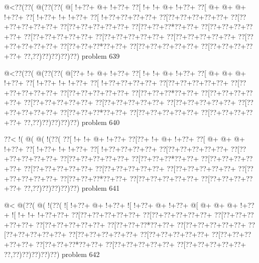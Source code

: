 \vbox{\vbox{\goo
\- @<\0??(\0??(\- @(\0??(\0??(
\- @[\- !+\0??+\- @+\- !+\0??+
\0??[\- !+\- !+\- @+\- !+\0??+
\0??[\- @+\- @+\- @+\- !+\0??+
\0??[\- !+\0??+\- !+\- !+\0??+
\0??[\- !+\0??+\0??+\0??+\0??+
\0??[\0??+\0??+\0??+\0??+\0??+
\0??[\0??+\0??+\0??+\0??+\0??+
\0??[\0??+\0??+\0??+\0??+\0??+
\0??[\0??+\0??+\0??*\0??+\0??+
\0??[\0??+\0??+\0??+\0??+\0??+
\0??[\0??+\0??+\0??+\0??+\0??+
\0??[\0??+\0??+\0??+\0??+\0??+
\0??[\0??+\0??+\0??+\0??+\0??+
\0??[\0??+\0??+\0??+\0??+\0??+
\0??[\0??+\0??+\0??*\0??+\0??+
\0??[\0??+\0??+\0??+\0??+\0??+
\0??[\0??+\0??+\0??+\0??+\0??+
\0??,\0??)\0??)\0??)\0??)\0??)
}
\hfil problem 639\hfil\break
}

\vbox{\vbox{\goo
\- @<\0??(\0??(\- @(\0??(\0??(
\- @[\0??+\- !+\- @+\- !+\0??+
\0??[\- !+\- !+\- @+\- !+\0??+
\0??[\- @+\- @+\- @+\- !+\0??+
\0??[\- !+\0??+\- !+\- !+\0??+
\0??[\- !+\0??+\0??+\0??+\0??+
\0??[\0??+\0??+\0??+\0??+\0??+
\0??[\0??+\0??+\0??+\0??+\0??+
\0??[\0??+\0??+\0??+\0??+\0??+
\0??[\0??+\0??+\0??*\0??+\0??+
\0??[\0??+\0??+\0??+\0??+\0??+
\0??[\0??+\0??+\0??+\0??+\0??+
\0??[\0??+\0??+\0??+\0??+\0??+
\0??[\0??+\0??+\0??+\0??+\0??+
\0??[\0??+\0??+\0??+\0??+\0??+
\0??[\0??+\0??+\0??*\0??+\0??+
\0??[\0??+\0??+\0??+\0??+\0??+
\0??[\0??+\0??+\0??+\0??+\0??+
\0??,\0??)\0??)\0??)\0??)\0??)
}
\hfil problem 640\hfil\break
}

\vbox{\vbox{\goo
\0??<\- !(\- @(\- @(\- !(\0??(
\0??[\- !+\- !+\- @+\- !+\0??+
\0??[\0??+\- !+\- @+\- !+\0??+
\0??[\- @+\- @+\- @+\- !+\0??+
\0??[\- !+\0??+\- !+\- !+\0??+
\0??[\- !+\0??+\0??+\0??+\0??+
\0??[\0??+\0??+\0??+\0??+\0??+
\0??[\0??+\0??+\0??+\0??+\0??+
\0??[\0??+\0??+\0??+\0??+\0??+
\0??[\0??+\0??+\0??*\0??+\0??+
\0??[\0??+\0??+\0??+\0??+\0??+
\0??[\0??+\0??+\0??+\0??+\0??+
\0??[\0??+\0??+\0??+\0??+\0??+
\0??[\0??+\0??+\0??+\0??+\0??+
\0??[\0??+\0??+\0??+\0??+\0??+
\0??[\0??+\0??+\0??*\0??+\0??+
\0??[\0??+\0??+\0??+\0??+\0??+
\0??[\0??+\0??+\0??+\0??+\0??+
\0??,\0??)\0??)\0??)\0??)\0??)
}
\hfil problem 641\hfil\break
}

\vbox{\vbox{\goo
\- @<\- @(\0??(\- @(\- !(\0??(
\- ![\- !+\0??+\- @+\- !+\0??+
\- ![\- !+\0??+\- @+\- !+\0??+
\- @[\- @+\- @+\- @+\- !+\0??+
\- ![\- !+\- !+\- !+\0??+\0??+
\0??[\0??+\0??+\0??+\0??+\0??+
\0??[\0??+\0??+\0??+\0??+\0??+
\0??[\0??+\0??+\0??+\0??+\0??+
\0??[\0??+\0??+\0??+\0??+\0??+
\0??[\0??+\0??+\0??*\0??+\0??+
\0??[\0??+\0??+\0??+\0??+\0??+
\0??[\0??+\0??+\0??+\0??+\0??+
\0??[\0??+\0??+\0??+\0??+\0??+
\0??[\0??+\0??+\0??+\0??+\0??+
\0??[\0??+\0??+\0??+\0??+\0??+
\0??[\0??+\0??+\0??*\0??+\0??+
\0??[\0??+\0??+\0??+\0??+\0??+
\0??[\0??+\0??+\0??+\0??+\0??+
\0??,\0??)\0??)\0??)\0??)\0??)
}
\hfil problem 642\hfil\break
}

